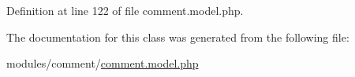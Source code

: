 Definition at line 122 of file comment.\+model.\+php.



The documentation for this class was generated from the following file\+:\begin{DoxyCompactItemize}
\item 
modules/comment/\hyperlink{comment_8model_8php}{comment.\+model.\+php}\end{DoxyCompactItemize}

